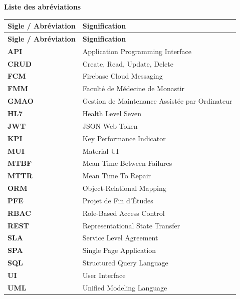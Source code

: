 \newpage
\thispagestyle{plain}
\begin{center}
    {\fontsize{20}{24}\selectfont\bfseries Liste des abréviations}
\end{center}
\vspace{1cm}

\begin{longtable}{p{4cm} p{10cm}}
\hline
\textbf{Sigle / Abréviation} & \textbf{Signification} \\
\hline
\endfirsthead
\hline
\textbf{Sigle / Abréviation} & \textbf{Signification} \\
\hline
\endhead
\textbf{API} & Application Programming Interface \\
\textbf{CRUD} & Create, Read, Update, Delete \\
\textbf{FCM} & Firebase Cloud Messaging \\
\textbf{FMM} & Faculté de Médecine de Monastir \\
\textbf{GMAO} & Gestion de Maintenance Assistée par Ordinateur \\
\textbf{HL7} & Health Level Seven \\
\textbf{JWT} & JSON Web Token \\
\textbf{KPI} & Key Performance Indicator \\
\textbf{MUI} & Material-UI \\
\textbf{MTBF} & Mean Time Between Failures \\
\textbf{MTTR} & Mean Time To Repair \\
\textbf{ORM} & Object-Relational Mapping \\
\textbf{PFE} & Projet de Fin d'Études \\
\textbf{RBAC} & Role-Based Access Control \\
\textbf{REST} & Representational State Transfer \\
\textbf{SLA} & Service Level Agreement \\
\textbf{SPA} & Single Page Application \\
\textbf{SQL} & Structured Query Language \\
\textbf{UI} & User Interface \\
\textbf{UML} & Unified Modeling Language \\
\hline
\end{longtable}
